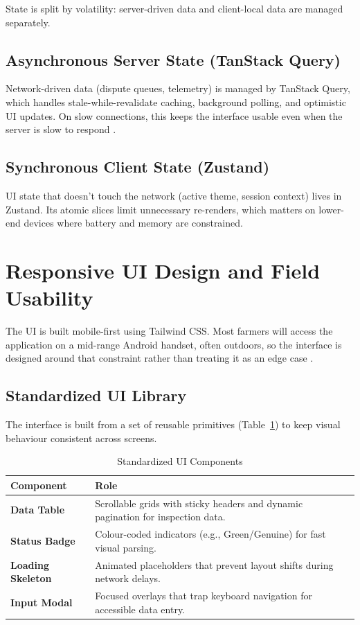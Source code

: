 State is split by volatility: server-driven data and client-local data are managed separately.

\subsection{Asynchronous Server State (TanStack Query)}
Network-driven data (dispute queues, telemetry) is managed by TanStack Query, which handles stale-while-revalidate caching, background polling, and optimistic UI updates. On slow connections, this keeps the interface usable even when the server is slow to respond \cite{tanstack2024}.

\subsection{Synchronous Client State (Zustand)}
UI state that doesn't touch the network (active theme, session context) lives in Zustand. Its atomic slices limit unnecessary re-renders, which matters on lower-end devices where battery and memory are constrained.

\section{Responsive UI Design and Field Usability}
\label{sec:responsive-ui}

The UI is built mobile-first using Tailwind CSS. Most farmers will access the application on a mid-range Android handset, often outdoors, so the interface is designed around that constraint rather than treating it as an edge case \cite{singh2026impact}.

\subsection{Standardized UI Library}
The interface is built from a set of reusable primitives (Table~\ref{tab:ui-components}) to keep visual behaviour consistent across screens.

\begin{table}[H]
\centering
\footnotesize
\caption{Standardized UI Components}
\label{tab:ui-components}
\begin{tabularx}{\textwidth}{@{}l X@{}}
\toprule
\textbf{Component} & \textbf{Role} \\
\midrule
\textbf{Data Table} & Scrollable grids with sticky headers and dynamic pagination for inspection data. \\
\textbf{Status Badge} & Colour-coded indicators (e.g., Green/Genuine) for fast visual parsing. \\
\textbf{Loading Skeleton} & Animated placeholders that prevent layout shifts during network delays. \\
\textbf{Input Modal} & Focused overlays that trap keyboard navigation for accessible data entry. \\
\bottomrule
\end{tabularx}
\end{table}


